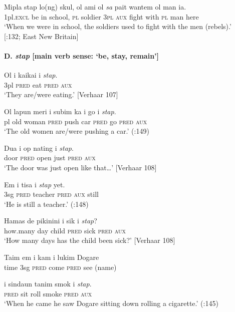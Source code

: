 \ea
\gll Mipla  stap  lo(ng)  skul,  ol  ami  ol  \textit{sa}  pait  wantem  ol  man  ia.\\
1pl.\textsc{excl}  be  in  school,  \textsc{pl}  soldier  3\textsc{pl}  \textsc{aux}  fight  with  \textsc{pl}  man  here\\
\glt ‘When we were in school, the soldiers used to fight with the men (rebels).’\\
{}[\citealt{Smith2002}:132; East New Britain]
\z

\paragraph*{D. \textit{stap}  [main verb sense: ‘be, stay, remain’]}
\ea
\gll Ol  i  kaikai  i \textit{stap}.\\
3pl  \textsc{pred}  eat  \textsc{pred}  \textsc{aux}\\
\glt ‘They are/were eating.’  [Verhaar 107]
\z

\ea
\gll   Ol  lapun  meri  i  subim  ka  i  go  i \textit{stap}.\\
pl  old  woman  \textsc{pred}  push  car  \textsc{pred}  go  \textsc{pred}  \textsc{aux}\\
\glt ‘The old women are/were pushing a car.’  (\citealt{Dutton1973}:149)
\z

\ea
\gll  Dua  i  op  nating  i \textit{stap}.\\
door  \textsc{pred}  open  just  \textsc{pred}  \textsc{aux}\\
\glt ‘The door was just open like that…’  [Verhaar 108]
\z

\ea
\gll Em  i tisa  i \textit{stap}  yet.\\
3sg  \textsc{pred} teacher  \textsc{pred  aux}  still\\
\glt ‘He is still a teacher.’  (\citealt{Dutton1973}:148)
\z

\ea
\gll  Hamas  de  pikinini  i  sik  i \textit{stap}?\\
how.many  day  child  \textsc{pred}  sick  \textsc{pred}  \textsc{aux}\\
\glt ‘How many days has the child been sick?’  [Verhaar 108]
\z

\ea
\gll  Taim  em  i  kam  i lukim  Dogare\\
time  3sg  \textsc{pred}  come  \textsc{pred}  see  (name)\\
\z

\ea
\gll   i  sindaun  tanim  smok  i  \textit{stap}.\\
\textsc{pred}  sit  roll  smoke  \textsc{pred}  \textsc{aux}\\
\glt ‘When he came he saw Dogare sitting down rolling a cigarette.’ (\citealt{Dutton1973}:145)
\z

